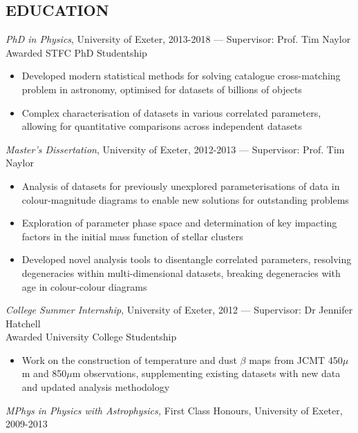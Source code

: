 \documentclass[letter, margin, 10pt]{res} %
\begin{document}
\begin{resume}
\section{EDUCATION}

{\sl PhD in Physics}, University of Exeter, 2013-2018 --- Supervisor: Prof. Tim Naylor\\
\null\quad\quad Awarded STFC PhD Studentship
\begin{itemize}[noitemsep,topsep=0pt,parsep=0pt,partopsep=0pt]
\item Developed modern statistical methods for solving catalogue cross-matching problem in astronomy, optimised for datasets of billions of objects
\item Complex characterisation of datasets in various correlated parameters, allowing for quantitative comparisons across independent datasets
\end{itemize}
\vspace{-10pt}
{\sl Master's Dissertation}, University of Exeter, 2012-2013 --- Supervisor: Prof. Tim Naylor
\begin{itemize}[noitemsep,topsep=0pt,parsep=0pt,partopsep=0pt]
\item Analysis of datasets for previously unexplored parameterisations of data in colour-magnitude diagrams to enable new solutions for outstanding problems
\item Exploration of parameter phase space and determination of key impacting factors in the initial mass function of stellar clusters
\item Developed novel analysis tools to disentangle correlated parameters, resolving degeneracies within multi-dimensional datasets, breaking degeneracies with age in colour-colour diagrams
\end{itemize}
\vspace{-10pt}
{\sl College Summer Internship}, University of Exeter, 2012 --- Supervisor: Dr Jennifer Hatchell\\
\null\quad\quad Awarded University College Studentship
\begin{itemize}[noitemsep,topsep=0pt,parsep=0pt,partopsep=0pt]
\item Work on the construction of temperature and dust $\beta$ maps from JCMT 450$\mu$m and 850$\mu$m observations, supplementing existing datasets with new data and updated analysis methodology
\end{itemize}
\vspace{-10pt}
{\sl MPhys in Physics with Astrophysics,} First Class Honours, University of Exeter, 2009-2013


\end{resume}
\end{document}
